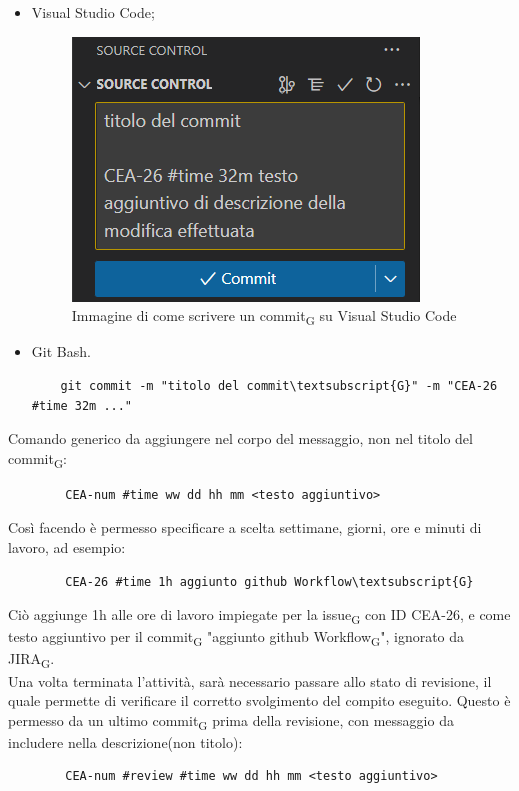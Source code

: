 	\begin{itemize}
		\item Visual Studio Code;
		\begin{figure}[ht!]
			\centering
			\includegraphics[scale=0.7]{img/visual_code_example.png}
			\caption{Immagine di come scrivere un commit\textsubscript{G} su Visual Studio Code}
		\end{figure}
		\item Git Bash.
		\begin{lstlisting}
	git commit -m "titolo del commit\textsubscript{G}" -m "CEA-26 #time 32m ..."
		\end{lstlisting}
	\end{itemize}
	Comando generico da aggiungere nel corpo del messaggio, non nel titolo del commit\textsubscript{G}:
	\begin{lstlisting}
		CEA-num #time ww dd hh mm <testo aggiuntivo>
	\end{lstlisting}
	Così facendo è permesso specificare a scelta settimane, giorni, ore e minuti di lavoro, ad esempio:
	\begin{lstlisting}
		CEA-26 #time 1h aggiunto github Workflow\textsubscript{G}
	\end{lstlisting}
	Ciò aggiunge 1h alle ore di lavoro impiegate per la issue\textsubscript{G} con ID CEA-26, e come testo aggiuntivo per il commit\textsubscript{G} "aggiunto github Workflow\textsubscript{G}", ignorato da JIRA\textsubscript{G}.\\
	Una volta terminata l'attività, sarà necessario passare allo stato di revisione, il quale permette di verificare il corretto svolgimento del compito eseguito. Questo è permesso da un ultimo commit\textsubscript{G} prima della revisione, con messaggio da includere nella descrizione(non titolo):
	\begin{lstlisting}
		CEA-num #review #time ww dd hh mm <testo aggiuntivo>
	\end{lstlisting}
